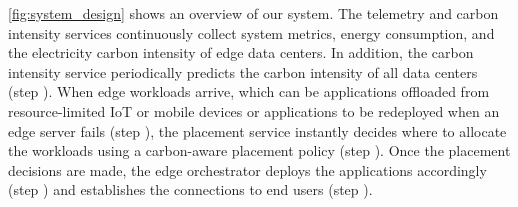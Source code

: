 \autoref{fig:system_design} shows an overview of our system. The telemetry and carbon intensity services continuously collect system metrics, energy consumption, and the electricity carbon intensity of edge data centers. In addition, the carbon intensity service periodically predicts the carbon intensity of all data centers (step ). When edge workloads arrive, which can be applications offloaded from resource-limited IoT or mobile devices or applications to be redeployed when an edge server fails (step ), the placement service instantly decides where to allocate the workloads using a carbon-aware placement policy (step ). Once the placement decisions are made, the edge orchestrator deploys the applications accordingly (step ) and establishes the connections to end users (step ). 











